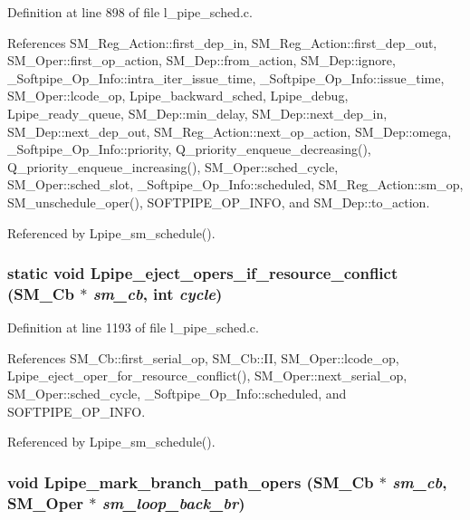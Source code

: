 Definition at line 898 of file l\_\-pipe\_\-sched.c.

References SM\_\-Reg\_\-Action::first\_\-dep\_\-in, SM\_\-Reg\_\-Action::first\_\-dep\_\-out, SM\_\-Oper::first\_\-op\_\-action, SM\_\-Dep::from\_\-action, SM\_\-Dep::ignore, \_\-Softpipe\_\-Op\_\-Info::intra\_\-iter\_\-issue\_\-time, \_\-Softpipe\_\-Op\_\-Info::issue\_\-time, SM\_\-Oper::lcode\_\-op, Lpipe\_\-backward\_\-sched, Lpipe\_\-debug, Lpipe\_\-ready\_\-queue, SM\_\-Dep::min\_\-delay, SM\_\-Dep::next\_\-dep\_\-in, SM\_\-Dep::next\_\-dep\_\-out, SM\_\-Reg\_\-Action::next\_\-op\_\-action, SM\_\-Dep::omega, \_\-Softpipe\_\-Op\_\-Info::priority, Q\_\-priority\_\-enqueue\_\-decreasing(), Q\_\-priority\_\-enqueue\_\-increasing(), SM\_\-Oper::sched\_\-cycle, SM\_\-Oper::sched\_\-slot, \_\-Softpipe\_\-Op\_\-Info::scheduled, SM\_\-Reg\_\-Action::sm\_\-op, SM\_\-unschedule\_\-oper(), SOFTPIPE\_\-OP\_\-INFO, and SM\_\-Dep::to\_\-action.

Referenced by Lpipe\_\-sm\_\-schedule().
\subsubsection{\setlength{\rightskip}{0pt plus 5cm}static void Lpipe\_\-eject\_\-opers\_\-if\_\-resource\_\-conflict (\bf{SM\_\-Cb} $\ast$ {\em sm\_\-cb}, int {\em cycle})\hspace{0.3cm}{\tt  [static]}}\label{l__pipe__sched_8c_0eaa7e805044e0128ed051caf6039ffb}




Definition at line 1193 of file l\_\-pipe\_\-sched.c.

References SM\_\-Cb::first\_\-serial\_\-op, SM\_\-Cb::II, SM\_\-Oper::lcode\_\-op, Lpipe\_\-eject\_\-oper\_\-for\_\-resource\_\-conflict(), SM\_\-Oper::next\_\-serial\_\-op, SM\_\-Oper::sched\_\-cycle, \_\-Softpipe\_\-Op\_\-Info::scheduled, and SOFTPIPE\_\-OP\_\-INFO.

Referenced by Lpipe\_\-sm\_\-schedule().
\subsubsection{\setlength{\rightskip}{0pt plus 5cm}void Lpipe\_\-mark\_\-branch\_\-path\_\-opers (\bf{SM\_\-Cb} $\ast$ {\em sm\_\-cb}, \bf{SM\_\-Oper} $\ast$ {\em sm\_\-loop\_\-back\_\-br})}\label{l__pipe__sched_8c_1f114627d53f0fcfd8f9b0b943d8750f}




